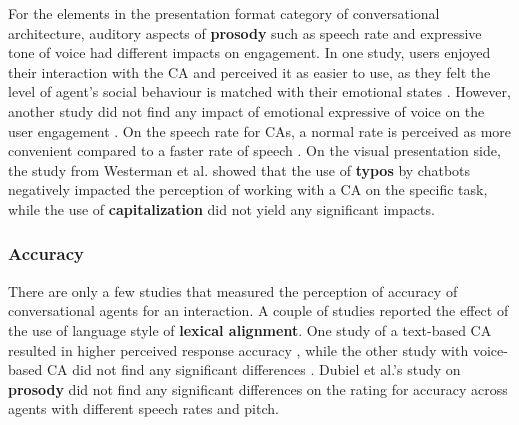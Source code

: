\documentclass[sigconf,screen,review, anonymous]{acmart}
\newcommand{\cmt}[1]{}%
\begin{document}
For the elements in the presentation format category of conversational architecture, auditory aspects of \textbf{prosody} such as speech rate and expressive tone of voice had different impacts on engagement. In one study, users enjoyed their interaction with the CA and perceived it as easier to use, as they felt the level of agent's social behaviour is matched with their emotional states \cite{kim2020can}\cmt{[24]}. However, another study did not find any impact of emotional expressive of voice on the user engagement \cite{zhu2022effects}\cmt{[26]}. On the speech rate for CAs, a normal rate is perceived as more convenient compared to a faster rate of speech \cite{choi2020nobody}\cmt{[54]}. On the visual presentation side, the study from Westerman et al. \cite{westerman2019believe}\cmt{[9]} showed that the use of \textbf{typos} by chatbots negatively impacted the perception of working with a CA on the specific task, while the use of \textbf{capitalization} did not yield any significant impacts.

%




\subsubsection{Accuracy}
There are only a few studies that measured the perception of accuracy of conversational agents for an interaction. A couple of studies reported the effect of the use of language style of \textbf{lexical alignment}. One study of a text-based CA resulted in higher perceived response accuracy \cite{huiyang2022improving}\cmt{[17]}, while the other study with voice-based CA did not find any significant differences \cite{linnemann2018can}\cmt{[15]}. Dubiel et al.'s study \cite{dubiel2020persuasive}\cmt{[60]} on \textbf{prosody} did not find any significant differences on the rating for accuracy across agents with different speech rates and pitch.
\end{document}
